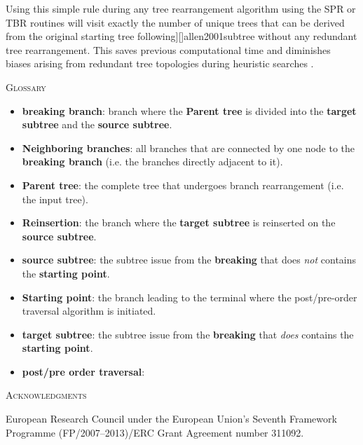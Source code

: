 \documentclass[12pt,letterpaper]{article}
\renewcommand{\section}[1]{%
\bigskip
\begin{center}
\begin{Large}
\normalfont\scshape #1
\medskip
\end{Large}
\end{center}}
\begin{document}
Using this simple rule during any tree rearrangement algorithm using the SPR or TBR routines will visit exactly the number of unique trees that can be derived from the original starting tree following][]{allen2001subtree} without any redundant tree rearrangement.
This saves previous computational time and diminishes biases arising from redundant tree topologies during heuristic searches \citep{goloboff2014bias}.

\section{Glossary}
\label{Glossary}

\begin{itemize}
    \item{\textbf{breaking branch}: branch where the \textbf{Parent tree} is divided into the \textbf{target subtree} and the \textbf{source subtree}.}
    \item{\textbf{Neighboring branches}: all branches that are connected by one node to the \textbf{breaking branch} (i.e. the branches directly adjacent to it).}
    \item{\textbf{Parent tree}: the complete tree that undergoes branch rearrangement (i.e. the input tree).}
    \item{\textbf{Reinsertion}: the branch where the \textbf{target subtree} is reinserted on the \textbf{source subtree}.}
    \item{\textbf{source subtree}: the subtree issue from the \textbf{breaking} that does \textit{not} contains the \textbf{starting point}.}
    \item{\textbf{Starting point}: the branch leading to the terminal where the post/pre-order traversal algorithm is initiated.}
    \item{\textbf{target subtree}: the subtree issue from the \textbf{breaking} that \textit{does} contains the \textbf{starting point}.}
    \item{\textbf{post/pre order traversal}: }
\end{itemize}


\section{Acknowledgments}
European Research Council under the European Union’s Seventh Framework Programme (FP/2007–2013)/ERC Grant Agreement number 311092.



\end{document}
